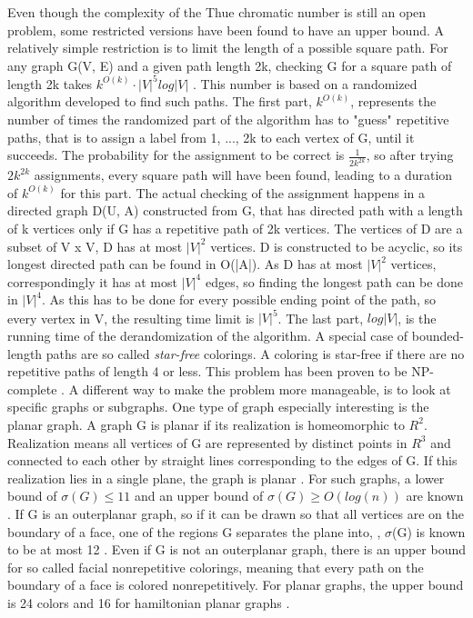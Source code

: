\documentclass[12pt,a4paper]{article}
\begin{document}
Even though the complexity of the Thue chromatic number is still an open problem, some restricted versions have been found to have an upper bound. A relatively simple restriction is to limit the length of a possible square path. For any graph G(V, E) and a given path length 2k, checking G for a square path of length 2k takes $k^{O(k)} \cdot |V|^5 log |V|$ \citep{Marx2009}. This number is based on a randomized algorithm developed to find such paths. The first part, $k^{O(k)}$, represents the number of times the randomized part of the algorithm has to "guess" repetitive paths, that is to assign a label from {1, ..., 2k} to each vertex of G, until it succeeds. The probability for the assignment to be correct is $\frac{1}{2k^{2k}}$, so after trying $2k^{2k}$ assignments, every square path will have been found, leading to a duration of $k^{O(k)}$ for this part. The actual checking of the assignment happens in a directed graph D(U, A) constructed from G, that has directed path with a length of k vertices only if G has a repetitive path of 2k vertices. The vertices of D are a subset of V x V, D has at most $|V|^2$ vertices. D is constructed to be acyclic, so its longest directed path can be found in O(|A|). As D has at most $|V|^2$ vertices, correspondingly it has at most $|V|^4$ edges, so finding the longest path can be done in $|V|^4$. As this has to be done for every possible ending point of the path, so every vertex in V, the resulting time limit is $|V|^5$. The last part, $log |V|$, is the running time of the derandomization of the algorithm. 
\newline
A special case of bounded-length paths are so called \textit{star-free} colorings. A coloring is star-free if there are no repetitive paths of length 4 or less. This problem has been proven to be NP-complete \citep{Coleman1984}. 
\newline
A different way to make the problem more manageable, is to look at specific graphs or subgraphs. One type of graph especially interesting is the planar graph. A graph G is planar if its realization is homeomorphic to $R^2$. Realization means all vertices of G are represented by distinct points in $R^3$ and connected to each other by straight lines corresponding to the edges of G. If this realization lies in a single plane, the graph is planar \citep[p. 21]{Bollobas1998}. For such graphs, a lower bound of $\sigma(G) \leq 11$ and an upper bound of $\sigma(G) \geq O(log(n))$ are known \citep{Dujmovic2012}. If G is an outerplanar graph, so if it can be drawn so that all vertices are on the boundary of a face, one of the regions G separates the plane into, \citep[p. 36]{Bollobas1998}, $\sigma$(G) is known to be at most 12 \citep{Barat2007}. Even if G is not an outerplanar graph, there is an upper bound for so called facial nonrepetitive colorings, meaning that every path on the boundary of a face is colored nonrepetitively. For planar graphs, the upper bound is 24 colors \citep{Barat2013} and 16 for hamiltonian planar graphs \citep{Harant2011}. 
\end{document}
